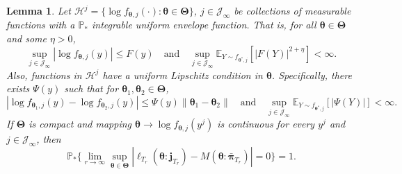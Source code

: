 \documentclass[12pt]{article}
\newcommand{\bfTheta}{\boldsymbol{\Theta}}
\newcommand{\bfpi}{\boldsymbol{\pi}}
\newcommand{\bftheta}{\boldsymbol{\theta}}
\newtheorem{lemma}[theorem]{Lemma}
\begin{document}
\begin{lemma} 
\label{lemma:lemma5}
Let $\mathcal{H}^j = \{ \log f_{\bftheta, j}( \cdot ): \bftheta \in \bfTheta \}$, $j \in \mathcal{J}_{\infty}$ be collections of measurable functions with a $\mathbb{P}_{\ast}$ integrable uniform envelope function. That is, for all $\bftheta \in \bfTheta$ and some $\eta > 0$,
\begin{equation*}
\sup_{j \in \mathcal{J}_{\infty}} | \log f_{\bftheta, j}(y)| \leq F(y)
\quad \text{and} \quad \sup_{j \in \mathcal{J}_{\infty}} \mathbb{E}_{Y \sim f_{\bftheta^{\ast}, j}}[|F(Y)|^{2+\eta}] < \infty. 
\end{equation*}
Also, functions in $\mathcal{H}^j$ have a uniform Lipschitz condition in $\bftheta$. Specifically, there exists $\Psi(y)$ such that for $\bftheta_1, \bftheta_2 \in \bfTheta$,
\begin{equation*}
| \log f_{\bftheta_1, j}(y) - \log f_{\bftheta_2, j}(y) | \leq \Psi(y) \| \bftheta_1 - \bftheta_2 \| \quad \text{and} \quad \sup_{j \in \mathcal{J}_{\infty}} \mathbb{E}_{Y \sim f_{\bftheta^{\ast}, j}}[|\Psi(Y)|] < \infty.
\end{equation*}
If $\bfTheta$ is compact and mapping $\bftheta \to \log f_{\bftheta, j}(y^j)$ is continuous for every $y^j$ and $j \in \mathcal{J}_{\infty}$, then
\begin{equation*}
\mathbb{P}_{\ast} \Big\{ \lim_{r \to \infty} \sup_{\bftheta \in \bfTheta} | \ell_{T_r}(\bftheta : \mathbf{j}_{T_r}) - M(\bftheta : \bar{\bfpi}_{T_r})| = 0 \Big\} = 1.
\end{equation*}
\end{lemma}
\end{document}
